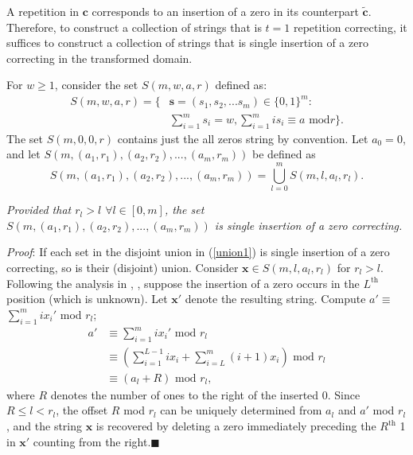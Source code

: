 A repetition in $\mathbf{c}$ corresponds to an insertion of a zero
in its counterpart $\mathbf{\tilde{c}}$. Therefore, to construct a
collection of strings that is $t=1$ repetition correcting, it
suffices to construct a collection of strings that is single
insertion of a zero correcting in the transformed domain.

For $w \geq 1$, consider the set $S(m,w,a,r)$ defined as:
\begin{equation}\label{s1}\begin{array}{ll}S(m,w,a,r)= \{ & \mathbf{s}=(s_1, s_2, ... s_m) \in \{0,1\}^m
:\\
{} & \sum_{i=1}^m s_i = w, \sum_{i=1}^m is_i \equiv a  \text{ mod
}r \}.\end{array}\end{equation} The set $S(m,0,0,r)$ contains just
the all zeros string by convention. Let $a_0 = 0$, and let
$S\left(m,(a_1,r_1),(a_2,r_2),...,(a_m,r_m)\right)$ be defined as
\vspace{-0.1in}
\begin{equation}\label{union1}S\left(m,(a_1,r_1),(a_2,r_2),...,(a_m,r_m)\right)=
\bigcup_{l=0}^{m} S(m,l,a_l,r_l).\end{equation}
\begin{lemma}\label{lemma2}\textit{Provided that $r_l >l$ $\forall l \in [0,m]$, the
set $S\left(m,\left(a_1,r_1\right),(a_2,r_2),...,(a_m,r_m)\right)$
is single insertion of a zero correcting.}\end{lemma}


\textit{Proof}: If each set in the disjoint union in
(\ref{union1}) is single insertion of a zero correcting, so is
their (disjoint) union. Consider $\mathbf{x} \in S(m,l,a_l,r_l)$
for $r_l > l$. Following the analysis in \cite{lev:66},
\cite{sloane:00}, suppose the insertion of a zero occurs in the
$L^{\text{th}}$ position (which is unknown). Let $\mathbf{x'}$
denote the resulting string. Compute $a' \equiv$ $\sum_{i=1}^m
ix_i'$ mod $r_l$;
\begin{equation}\begin{array}{lll}a'
& \equiv \sum_{i=1}^m ix_i' \text{ mod } r_l \\
{} & \equiv \left(\sum_{i=1}^{L-1} ix_i+ \sum_{i=L}^{m}
(i+1)x_i\right) \text{ mod }r_l\\ {} & \equiv \left(a_l+R
\right)\text{ mod }r_l,\end{array}\end{equation} where $R$ denotes
the number of ones to the right of the inserted 0. Since $R \leq l
< r_l$, the offset $R$ mod $r_l$ can be uniquely determined from
$a_l$ and $a'$ mod $r_l$, and the string $\mathbf{x}$ is recovered
by deleting a zero immediately preceding the $R^{\text{th}}$ 1 in
$\mathbf{x'}$ counting from the right.\hfill$\blacksquare$


